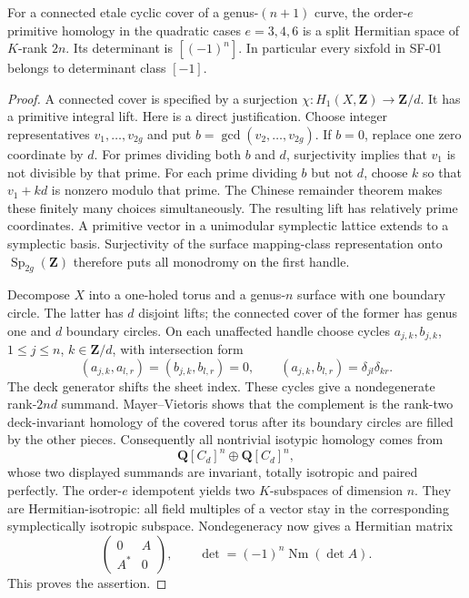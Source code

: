 \begin{proposition}
\label{SF-02}
For a connected etale cyclic cover of a genus-$(n+1)$ curve, the
order-$e$ primitive homology in the quadratic cases $e=3,4,6$ is a
split Hermitian space of $K$-rank $2n$. Its determinant is
$[(-1)^n]$. In particular every sixfold in SF-01 belongs to determinant
class $[-1]$.
\end{proposition}
\begin{proof}
A connected cover is specified by a surjection
$\chi:H_1(X,\mathbf Z)\to\mathbf Z/d$. It has a primitive integral
lift. Here is a direct justification. Choose integer representatives
$v_1,\ldots,v_{2g}$ and put $b=\gcd(v_2,\ldots,v_{2g})$.
If $b=0$, replace one zero coordinate by $d$. For primes dividing both
$b$ and $d$, surjectivity implies that $v_1$ is not divisible by that
prime. For each prime dividing $b$ but not $d$, choose $k$ so that
$v_1+kd$ is nonzero modulo that prime. The Chinese remainder theorem
makes these finitely many choices simultaneously. The resulting lift
has relatively prime coordinates. A primitive vector in a unimodular
symplectic lattice extends to a symplectic basis. Surjectivity of the
surface mapping-class representation onto $\operatorname{Sp}_{2g}(\mathbf Z)$
\cite[Theorem~6.4]{SF-FarbMargalit} therefore puts all monodromy on the
first handle.

Decompose $X$ into a one-holed torus and a genus-$n$ surface with one
boundary circle. The latter has $d$ disjoint lifts; the connected cover
of the former has genus one and $d$ boundary circles. On each unaffected
handle choose cycles $a_{j,k},b_{j,k}$, $1\le j\le n$,
$k\in\mathbf Z/d$, with intersection form
\[
 (a_{j,k},a_{l,r})=(b_{j,k},b_{l,r})=0,
 \qquad (a_{j,k},b_{l,r})=\delta_{jl}\delta_{kr}.
\]
The deck generator shifts the sheet index. These cycles give a
nondegenerate rank-$2nd$ summand. Mayer--Vietoris shows that the
complement is the rank-two deck-invariant homology of the covered
torus after its boundary circles are filled by the other pieces.
Consequently all nontrivial isotypic homology comes from
\[
 \mathbf Q[C_d]^n\oplus\mathbf Q[C_d]^n,
\]
whose two displayed summands are invariant, totally isotropic and
paired perfectly. The order-$e$ idempotent yields two $K$-subspaces of
dimension $n$. They are Hermitian-isotropic: all field multiples of a
vector stay in the corresponding symplectically isotropic subspace.
Nondegeneracy now gives a Hermitian matrix
\[
 \begin{pmatrix}0&A\\ A^*&0\end{pmatrix},
 \qquad \det=(-1)^n\operatorname{Nm}(\det A).
\]
This proves the assertion.
\end{proof}

